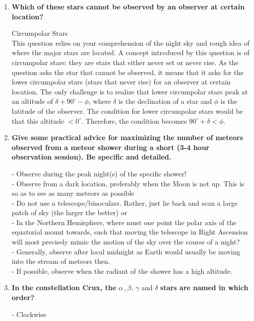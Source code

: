 \documentclass[a4paper,12pt]{extarticle}
\begin{document}
\begin{enumerate}
	\item \textbf{Which of these stars cannot be observed by an observer at certain location?}

\begin{sol}
	\textsf{Circumpolar Stars}\\
	
	This question relies on your comprehension of the night sky and rough idea of where the major stars are located. A concept introduced by this question is of circumpolar stars: they are stars that either never set or never rise. As the question asks the star that cannot be observed, it means that it asks for the lower circumpolar stars (stars that never rise) for an observer at certain location.
	The only challenge is to realize that lower circumpolar stars peak at an altitude of $\delta+ 90^\circ -\phi$,
	where $\delta$ is the declination of a star and $\phi$ is the latitude of the observer. The condition for lower
	circumpolar stars would be that this altitude $< 0^\circ$. Therefore, the condition becomes $90^\circ + \delta <\phi$.
\end{sol}
	

	
	
	\item \textbf{Give some practical advice for maximizing the number of meteors observed from a meteor shower during a short (3-4 hour observation session). Be specific and detailed.}
	
	\begin{sol}
		- Observe during the peak night(s) of the specific shower!\\
		- Observe from a dark location, preferably when the Moon is not up. This is so as to see as many meteors as possible\\
		- Do not use a telescope/binoculars. Rather, just lie back and scan a large patch of sky (the larger the better) or\\
		- In the Northern Hemisphere, where must one point the polar axis of the equatorial mount towards, such that moving the telescope in Right Ascension will most precisely mimic the motion of the sky over the course of a night?\\ 
		- Generally, observe after local midnight as Earth would usually be moving into the stream of meteors then.\\
		- If possible, observe when the radiant of the shower has a high altitude.
	\end{sol}
		\item \textbf{In the constellation Crux, the} $\alpha\,, \beta, \,\gamma$ and $\delta$ \textbf{stars are named in which order?}
		\begin{sol}
				- Clockwise
		\end{sol}
	


\end{enumerate}
\end{document}
